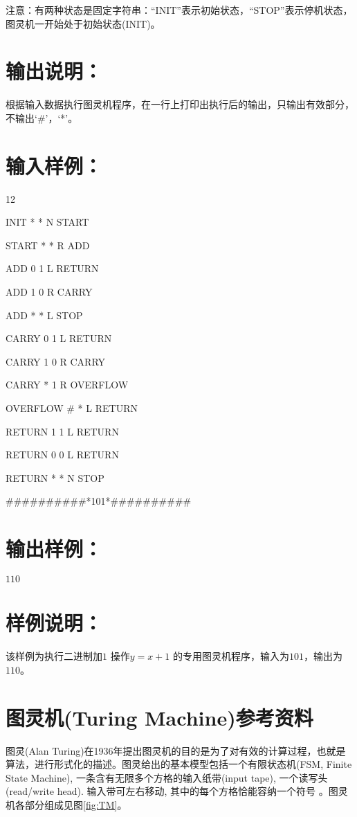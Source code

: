注意：有两种状态是固定字符串：``INIT''表示初始状态，``STOP''表示停机状态，图灵机一开始处于初始状态(INIT)。

\section*{输出说明：}

根据输入数据执行图灵机程序，在一行上打印出执行后的输出，只输出有效部分，不输出`\#'，`*'。

\section*{输入样例：}

12

INIT * * N START

START * * R ADD

ADD 0 1 L RETURN

ADD 1 0 R CARRY

ADD * * L STOP

CARRY 0 1 L RETURN

CARRY 1 0 R CARRY

CARRY * 1 R OVERFLOW

OVERFLOW \# * L RETURN

RETURN 1 1 L RETURN

RETURN 0 0 L RETURN

RETURN * * N STOP

\#\#\#\#\#\#\#\#\#\#*101*\#\#\#\#\#\#\#\#\#\#

\section*{输出样例：}

$110$

\section*{样例说明：}

该样例为执行二进制加$1$ 操作$y=x+1$ 的专用图灵机程序，输入为$101$，输出为$110$。

\section{图灵机(Turing Machine)参考资料}

图灵(Alan Turing)在1936年提出图灵机的目的是为了对有效的计算过程，也就是算法，进行形式化的描述。图灵给出的基本模型包括一个有限状态机(FSM, Finite State Machine), 一条含有无限多个方格的输入纸带(input tape), 一个读写头(read/write head). 输入带可左右移动, 其中的每个方格恰能容纳一个符号 。图灵机各部分组成见图\ref{fig:TM}。

